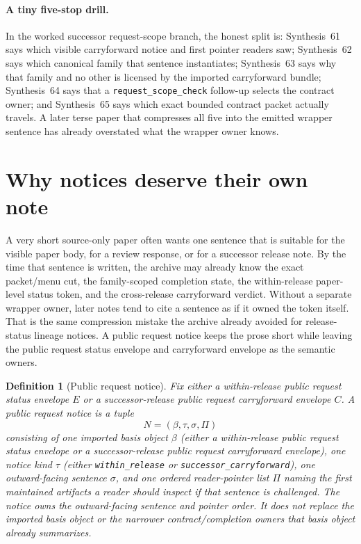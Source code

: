 \documentclass[11pt]{article}
\newtheorem{definition}{Definition}
\begin{document}
\paragraph{A tiny five-stop drill.}
In the worked successor request-scope branch, the honest split is: Synthesis~61 says which visible carryforward notice and first pointer readers saw; Synthesis~62 says which canonical family that sentence instantiates; Synthesis~63 says why that family and no other is licensed by the imported carryforward bundle; Synthesis~64 says that a \nolinkurl{request_scope_check} follow-up selects the contract owner; and Synthesis~65 says which exact bounded contract packet actually travels. A later terse paper that compresses all five into the emitted wrapper sentence has already overstated what the wrapper owner knows.

\section{Why notices deserve their own note}
A very short source-only paper often wants one sentence that is suitable for the visible paper body, for a review response, or for a successor release note.
By the time that sentence is written, the archive may already know the exact packet/menu cut, the family-scoped completion state, the within-release paper-level status token, and the cross-release carryforward verdict.
Without a separate wrapper owner, later notes tend to cite a sentence as if it owned the token itself.
That is the same compression mistake the archive already avoided for release-status lineage notices.
A public request notice keeps the prose short while leaving the public request status envelope and carryforward envelope as the semantic owners.

\begin{definition}[Public request notice]
Fix either a within-release public request status envelope $E$ or a successor-release public request carryforward envelope $C$.
A \emph{public request notice} is a tuple
\[
N=(\beta,\tau,\sigma,\Pi)
\]
consisting of one imported basis object $\beta$ (either a within-release public request status envelope or a successor-release public request carryforward envelope), one notice kind $\tau$ (either \texttt{within\_release} or \texttt{successor\_carryforward}), one outward-facing sentence $\sigma$, and one ordered reader-pointer list $\Pi$ naming the first maintained artifacts a reader should inspect if that sentence is challenged.
The notice owns the outward-facing sentence and pointer order.
It does not replace the imported basis object or the narrower contract/completion owners that basis object already summarizes.
\end{definition}
\end{document}
